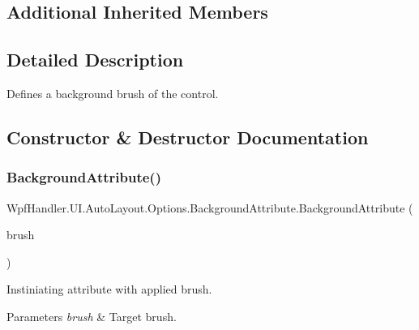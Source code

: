\subsection*{Additional Inherited Members}


\subsection{Detailed Description}
Defines a background brush of the control. 



\subsection{Constructor \& Destructor Documentation}
\mbox{\label{class_wpf_handler_1_1_u_i_1_1_auto_layout_1_1_options_1_1_background_attribute_ade7defa6df0ce136497f5f8d617d645e}} 
\subsubsection{\texorpdfstring{Background\+Attribute()}{BackgroundAttribute()}\hspace{0.1cm}{\footnotesize\ttfamily [1/4]}}
{\footnotesize\ttfamily Wpf\+Handler.\+U\+I.\+Auto\+Layout.\+Options.\+Background\+Attribute.\+Background\+Attribute (\begin{DoxyParamCaption}\item[{\mbox{\hyperlink{class_wpf_handler_1_1_u_i_1_1_color_attribute_afa14c4542d8023b3ddad6aba74993877}{Brush}}}]{brush }\end{DoxyParamCaption})}



Instiniating attribute with applied brush. 


\begin{DoxyParams}{Parameters}
{\em brush} & Target brush.\\
\hline
\end{DoxyParams}


